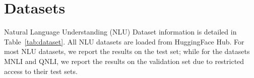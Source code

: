 \appendix

\section{Datasets}
Natural Language Understanding (NLU) Dataset information is detailed in Table~\ref{tab:dataset}. All NLU datasets are loaded from HuggingFace Hub. For most NLU datasets, we report the results on the test set; while for the datasets MNLI and QNLI, we report the results on the validation set due to restricted access to their test sets. 

\begin{table*}[t]
    \centering
    \caption{\textbf{Details of NLU datasets.}}
    \label{tab:dataset}
\end{table*}

